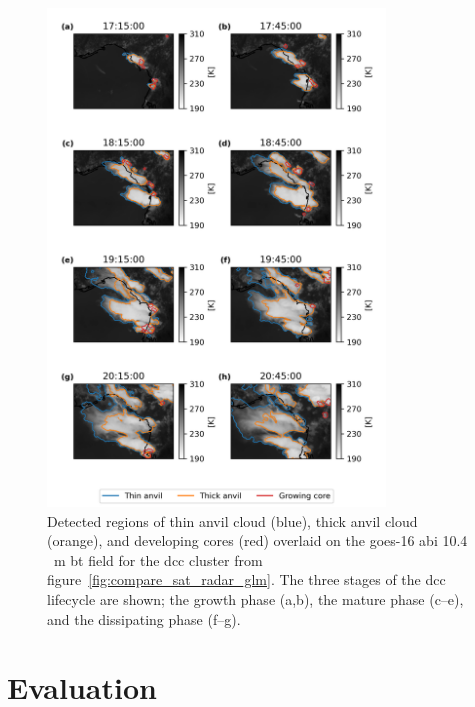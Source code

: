 \begin{figure}[tp]
    \centering\includegraphics[width=0.8\textwidth]{figures/chapter1_18.png}
    \caption[
    Detected regions of thin anvil cloud, thick anvil cloud, and developing cores through the growing, mature and dissipating phases of the \acrshort{dcc} lifecycle
    ]{
    Detected regions of thin anvil cloud (blue), thick anvil cloud (orange), and developing cores (red) overlaid on the \acrshort{goes}-16 \acrshort{abi} 10.4\,\unit{\mu m} \acrshort{bt} field for the \acrshort{dcc} cluster from figure~\ref{fig:compare_sat_radar_glm}. The three stages of the \acrshort{dcc} lifecycle are shown; the growth phase (a,b), the mature phase (c--e), and the dissipating phase (f--g).
    }
    \label{fig:detected_anvils}
\end{figure}


\section{Evaluation}


